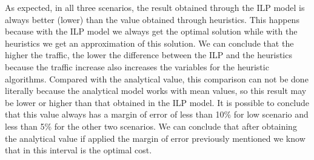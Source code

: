 \vspace{13pt}
As expected, in all three scenarios, the result obtained through the ILP model is always better (lower) than the value obtained through heuristics. This happens because with the ILP model we always get the optimal solution while with the heuristics we get an approximation of this solution. We can conclude that the higher the traffic, the lower the difference between the ILP and the heuristics because the traffic increase also increases the variables for the heuristic algorithms. Compared with the analytical value, this comparison can not be done literally because the analytical model works with mean values, so this result may be lower or higher than that obtained in the ILP model. It is possible to conclude that this value always has a margin of error of less than 10\% for low scenario and less than 5\% for the other two scenarios. We can conclude that after obtaining the analytical value if applied the margin of error previously mentioned we know that in this interval is the optimal cost.
